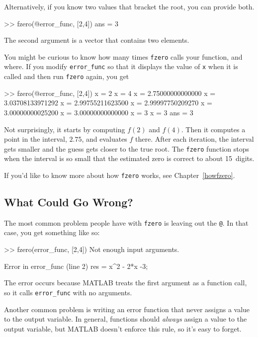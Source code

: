 Alternatively, if you know two values that bracket the root,
you can provide both.

\begin{code}
>> fzero(@error_func, [2,4])
ans = 3
\end{code}

The second argument is a vector that contains two elements.


You might be curious to know how many times \lstinline{fzero} calls your
function, and where.  If you modify \lstinline{error_func} so that it displays
the value of \lstinline{x} when it is called and then run \lstinline{fzero}
again, you get

\begin{code}
>> fzero(@error_func, [2,4])
x = 2
x = 4
x = 2.75000000000000
x = 3.03708133971292
x = 2.99755211623500
x = 2.99997750209270
x = 3.00000000025200
x = 3.00000000000000
x = 3
x = 3
ans = 3
\end{code}

Not surprisingly, it starts by computing $f(2)$ and $f(4)$.  Then it computes a point in the interval, $2.75$, and evaluates $f$ there.  After each iteration, the interval gets smaller and the guess gets closer to the true root.
The \lstinline{fzero} function stops when the interval is so small that the estimated
zero is correct to about 15~digits.

If you'd like to know more about how \lstinline{fzero} works, see Chapter~\ref{howfzero}.


\subsection{What Could Go Wrong?}

The most common problem people have with \lstinline{fzero} is leaving
out the \lstinline{@}.  In that case, you get something like so:

\begin{code}
>> fzero(error_func, [2,4])
Not enough input arguments.

Error in error_func (line 2)
    res = x^2 - 2*x -3;
\end{code}

The error occurs because MATLAB treats the first argument as a function call, so it calls \lstinline{error_func} with no arguments.


Another common problem is writing an error function that never
assigns a value to the output variable.  In general, functions should
\emph{always} assign a value to the output variable, but MATLAB doesn't
enforce this rule, so it's easy to forget.

